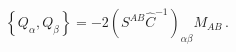 \begin{equation}
\left\{ Q_\alpha,Q_\beta\right\}=-2(S^{AB}\hat C^{-1})_{\alpha\beta} M_{AB}\,.
\end{equation}

